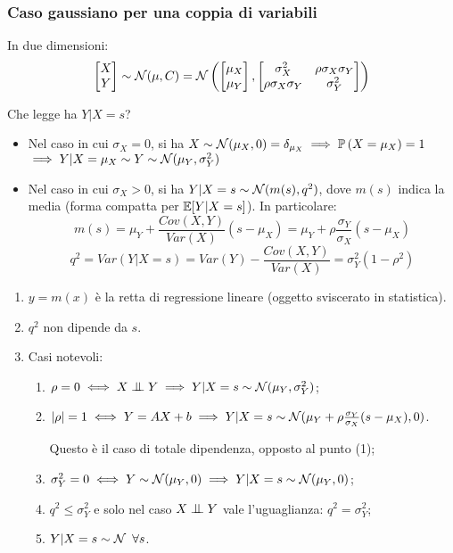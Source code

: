 \subsubsection{Caso gaussiano per una coppia di variabili}

In due dimensioni:
$$\begin{bmatrix}X \\ Y\end{bmatrix} \sim \mathcal N(\mu, C) = \mathcal N \left( \begin{bmatrix}\mu_X \\ \mu_Y\end{bmatrix}, \begin{bmatrix}\sigma_X^2 & \rho\sigma_X\sigma_Y \\ \rho\sigma_X\sigma_Y & \sigma_Y^2 \end{bmatrix} \right)$$

Che legge ha $Y|X = s$?
\begin{itemize}
  \item Nel caso in cui $\sigma_X = 0$, si ha $X \sim \mathcal N(\mu_X, 0) = \delta_{\mu_X} \implies \mathbb P\left(X = \mu_X\right) = 1$\\
    $\implies Y|X = \mu_X \sim Y \sim \mathcal N(\mu_Y, \sigma_Y^2)$

  \item Nel caso in cui $\sigma_X > 0$, si ha $Y|X = s \sim \mathcal N(m(s), q^2)$, dove $m(s)$ indica la media (forma compatta per $\mathbb E[Y|X = s]$). In particolare:
    $$m(s) = \mu_Y + \frac{Cov(X,Y)}{Var(X)}(s-\mu_X) = \mu_Y + \rho \frac{\sigma_Y}{\sigma_X}(s-\mu_X)$$
    $$q^2 = Var(Y|X=s)  = Var(Y) - \frac{Cov(X,Y)}{Var(X)} = \sigma_Y^2(1-\rho^2)$$
\end{itemize}

\begin{oss}
  \Fixvmode
  \begin{enumerate}
    \item $y = m(x)$ è la retta di regressione lineare (oggetto sviscerato in statistica).
    \item $q^2$ non dipende da $s$.
    \item Casi notevoli:
    \begin{enumerate}
      \item $\rho = 0 \iff X \indep Y \implies Y|X = s \sim \Nc(\mu_Y, \sigma_Y^2)$;
      \item $\lvert\rho\rvert = 1 \iff Y = AX+b \implies Y|X = s \sim \mathcal N(\mu_Y + \rho\frac{\sigma_Y}{\sigma_X} (s - \mu_X), 0)$.

      Questo è il caso di totale dipendenza, opposto al punto (1);
      \item $\sigma_Y^2 = 0 \iff Y \sim \mathcal N(\mu_Y, 0) \implies Y|X = s \sim \mathcal N(\mu_Y, 0)$;
      \item $q^2 \leq \sigma_Y^2$ e solo nel caso $X \indep Y$ vale l'uguaglianza: $q^2 = \sigma_Y^2$;
      \item $Y|X = s \sim \mathcal N \enspace \forall s$.
    \end{enumerate}
  \end{enumerate}
\end{oss}


